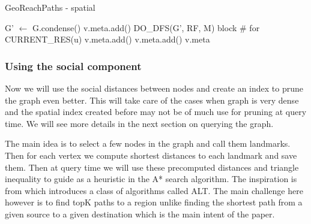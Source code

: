 {\begin{algorithm}[t]
\caption{GeoReachPaths - spatial}
\begin{scriptsize}
\label{alg1}
\begin{algorithmic}[1]
  \State G' $\gets$ G.condense() \label{alg:condense}
    \label{alg:onehopstart}
	  	\State v.meta.add()
	  \EndFor
	  \State {}
  \EndFor \label{alg:onehopend}
  \State DO\_DFS(G', RF, M)   \label{alg:dfs}
\EndFunction
{}
	\State \Return block \# for CURRENT\_RES(u)
\EndFunction
{}
		\State {}
	\EndWhile
\EndFunction
{}
		\State v.meta.add()
		\State {}
	\EndFor
\EndFunction
{}
		\State v.meta.add()
	\EndFor
	\State \Return v.meta
\EndFunction
\end{algorithmic}
\end{scriptsize}
\end{algorithm}

\subsubsection{Using the social component}
Now we will use the social distances between nodes and create an index to prune the graph even better. This will take care of the cases when graph is very dense and the spatial index created before may not be of much use for pruning at query time. We will see more details in the next section on querying the graph.

The main idea is to select a few nodes in the graph and call them landmarks. Then for each vertex we compute shortest distances to each landmark and save them. Then at query time we will use these precomputed distances and triangle inequality to guide as a heuristic in the A* search algorithm. The inspiration is from \cite{AC2005} which introduces a class of algorithms called ALT. The main challenge here however is to find topK paths to a region unlike finding the shortest path from a given source to a given destination which is the main intent of the paper.

}
